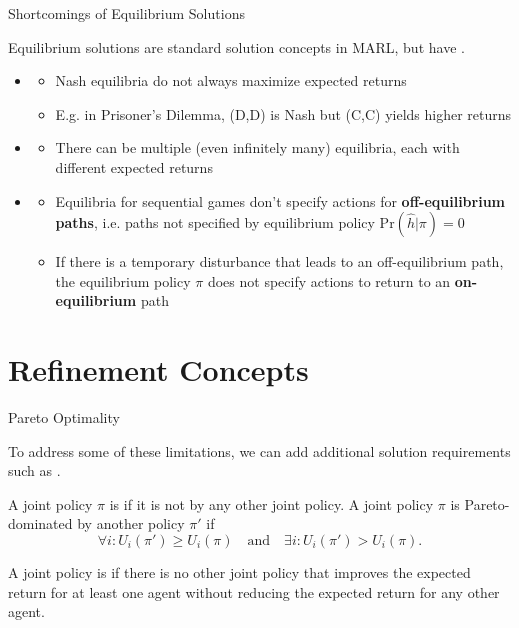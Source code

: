 \begin{frame}{Shortcomings of Equilibrium Solutions}

Equilibrium solutions are standard solution concepts in MARL, but have .
    
  \begin{itemize}
    \item<2-> 
      \begin{itemize}
        \item Nash equilibria do not always maximize expected returns
        \item E.g. in Prisoner’s Dilemma, (D,D) is Nash but (C,C) yields higher returns
      \end{itemize}
    \item<3-> 
      \begin{itemize}
        \item There can be multiple (even infinitely many) equilibria, each with different expected returns
      \end{itemize}
      \item<4-> 
      \begin{itemize}
        \item Equilibria for sequential games don't specify actions for {\bf off-equilibrium paths}, i.e. paths not specified by equilibrium policy \(\text{Pr}(\hat{h}|\pi) = 0\)
        \item If there is a temporary disturbance that leads to an off-equilibrium path, the equilibrium policy \(\pi\) does not specify actions to return to an {\bf on-equilibrium} path
    \end{itemize}
  \end{itemize}
\end{frame}

\section{Refinement Concepts}

\begin{frame}{Pareto Optimality}

 To address some of these limitations, we can add additional solution requirements such as .
 
 A joint policy \(\pi\) is  if it is not  by any other joint policy. A joint policy \(\pi\) is Pareto-dominated by another policy \(\pi'\) if
 \begin{equation*}
     \forall i: U_i(\pi') \geq U_i(\pi) \quad \text{and} \quad \exists i: U_i(\pi') > U_i(\pi).
 \end{equation*}

\begin{intuitionbox}
    A joint policy is  if there is no other joint policy that improves the expected return for at least one agent without reducing the expected return for any other agent.
\end{intuitionbox}
\end{frame}

